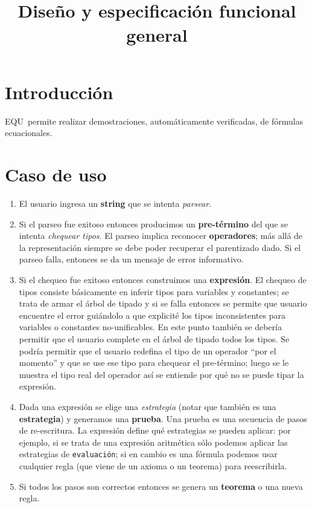 \documentclass{article}
\title{\equ\\
  Diseño y especificación funcional general}
\newcommand{\equ}{EQU}
\begin{document}
\maketitle

\section{Introducción}
\label{sec:intro}
\equ\ permite realizar demostraciones, automáticamente verificadas, de
fórmulas ecuacionales.

\section{Caso de uso}
\label{sec:usecase}
\begin{enumerate}
\item El usuario ingresa un \textbf{string} que se intenta \emph{parsear}.
\item Si el parseo fue exitoso entonces producimos un
  \textbf{pre-término} del que se intenta \emph{chequear tipos}. El
  parseo implica reconocer \textbf{operadores}; más allá de la
  representación siempre se debe poder recuperar el parentizado dado.
  Si el parseo falla, entonces se da un mensaje de error informativo.
\item Si el chequeo fue exitoso entonces construimos una
  \textbf{expresión}. El chequeo de tipos consiste básicamente en
  inferir tipos para variables y constantes; se trata de armar el
  árbol de tipado y si se falla entonces se permite que usuario
  encuentre el error guiándolo a que explicité los tipos inconsistentes
  para variables o constantes no-unificables. En este punto también
  se debería permitir que el usuario complete en el árbol de tipado
  todos los tipos. Se podría permitir que el usuario redefina el tipo
  de un operador ``por el momento'' y que se use ese tipo para chequear
  el pre-término; luego se le muestra el tipo real del operador así
  se entiende por qué no se puede tipar la expresión.
\item Dada una expresión se elige una \emph{estrategia} (notar que 
  también es una \textbf{estrategia}) y generamos una \textbf{prueba}.
  Una prueba es una secuencia de pasos de re-escritura. La expresión
  define qué estrategias se pueden aplicar: por ejemplo, si se trata
  de una expresión aritmética sólo podemos aplicar las estrategias de 
  \texttt{evaluación}; si en cambio es una fórmula podemos usar cualquier
  regla (que viene de un axioma o un teorema) para reescribirla.
\item Si todos los pasos son correctos entonces se genera un \textbf{teorema}
  o una nueva regla.
\end{enumerate}
\end{document}
